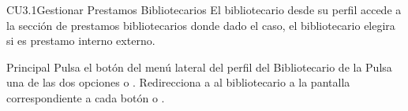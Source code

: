 
	\begin{UseCase}{CU3.1}{Gestionar Prestamos Bibliotecarios}{
		El bibliotecario desde su perfil accede a la sección de prestamos bibliotecarios donde dado el caso, el bibliotecario elegira si es prestamo interno externo.
	}
	\end{UseCase}
	\begin{UCtrayectoria}{Principal}
		\UCpaso[\UCactor] Pulsa el botón  del menú lateral del perfil del Bibliotecario de la 
		\UCpaso[\UCactor]Pulsa una de las dos opciones  o .
		\UCpaso[\UCsist]Redirecciona a al bibliotecario a la pantalla correspondiente a cada botón  o .
	\end{UCtrayectoria}
		
